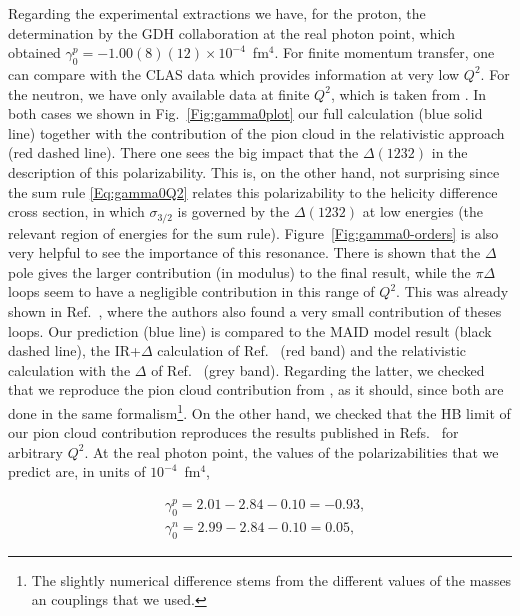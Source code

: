 \documentclass[prc,twocolumn,showpacs,preprintnumbers,amsmath,amssymb
,superscriptaddress,a4paper,nofootinbib
]{revtex4-1}
\begin{document}
Regarding the experimental extractions we have, for the proton, the determination by the GDH collaboration \cite{Dutz:2003mm}  at the real photon point, which obtained $\gamma_0^p=-1.00(8)(12)  \times 10^{-4}$~fm$^4$.
For finite momentum transfer, one can compare with the CLAS data \cite{Prok:2008ev} which provides information at very low $Q^2$.
For the neutron, we have only available data at finite $Q^2$, which is taken from \cite{Amarian:2004yf}.
In both cases we shown in Fig.~\ref{Fig:gamma0plot} our full calculation (blue solid line) together with the contribution of the pion cloud in the relativistic approach (red dashed line).
There one sees the big impact that the $\Delta(1232)$ in the description of this polarizability.
This is, on the other hand, not surprising since the sum rule \eqref{Eq:gamma0Q2} relates this polarizability to the helicity difference cross section, in which $\sigma_{3/2}$ is governed by the $\Delta(1232)$ at low energies (the relevant region of energies for the sum rule).
Figure~\ref{Fig:gamma0-orders} is also very helpful to see the importance of this resonance.
There is shown that the $\Delta$ pole gives the larger contribution (in modulus) to the final result, while the $\pi \Delta$ loops seem to have a negligible contribution in this range of $Q^2$.
This was already shown in Ref.~\cite{Bernard:2002pw}, where the authors also found a very small contribution of theses loops. 
Our prediction (blue line) is compared to the MAID model result (black dashed line), the IR+$\Delta$ calculation of Ref.~\cite{Bernard:2002pw} (red band) and the relativistic calculation with the $\Delta$ of Ref.~\cite{Bernard:2012hb} (grey band).
Regarding the latter, we checked that we reproduce the pion cloud contribution from \cite{Bernard:2012hb}, as it should, since both are done in the same formalism\footnote{The slightly numerical difference stems from the different values of the masses an couplings that we used.}.
On the other hand, we checked that the HB limit of our pion cloud contribution reproduces the results published in Refs.~\cite{Kao:2002cp,Bernard:1995dp} for arbitrary $Q^2$. 
At the real photon point, the values of the polarizabilities that we predict are, in units of $10^{-4}$~fm$^4$, 



\begin{align}
&\gamma^p_0 = 2.01 - 2.84 -0.10=-0.93, \label{Eq:gamma0ProtonRealPoint}\\
&\gamma^n_0 = 2.99 - 2.84-0.10  = 0.05,
\end{align}
\end{document}
